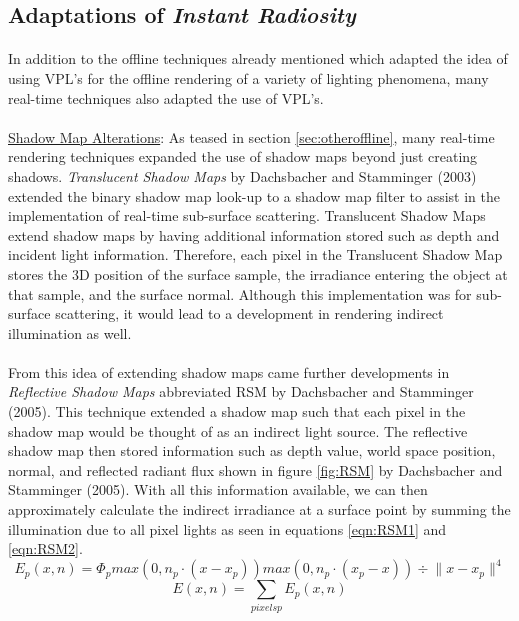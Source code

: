 \subsection{Adaptations of \textit{Instant Radiosity}}
\paragraph{}
In addition to the offline techniques already mentioned which adapted the idea of using VPL's for the offline rendering of a variety of lighting phenomena, many real-time techniques also adapted the use of VPL's.

\paragraph{}
\underline{Shadow Map Alterations}: As teased in section \ref{sec:otheroffline}, many real-time rendering techniques expanded the use of shadow maps beyond just creating shadows.  \textit{Translucent Shadow Maps} by Dachsbacher and Stamminger (2003) extended the binary shadow map look-up to a shadow map filter to assist in the implementation of real-time sub-surface scattering.  Translucent Shadow Maps extend shadow maps by having additional information stored such as depth and incident light information.  Therefore, each pixel in the Translucent Shadow Map stores the 3D position of the surface sample, the irradiance entering the object at that sample, and the surface normal.  Although this implementation was for sub-surface scattering, it would lead to a development in rendering indirect illumination as well.

\paragraph{}
From this idea of extending shadow maps came further developments in \textit{Reflective Shadow Maps} abbreviated RSM by Dachsbacher and Stamminger (2005).  This technique extended a shadow map such that each pixel in the shadow map would be thought of as an indirect light source.  The reflective shadow map then stored information such as depth value, world space position, normal, and reflected radiant flux shown in figure \ref{fig:RSM} by Dachsbacher and Stamminger (2005).  With all this information available, we can then approximately calculate the indirect irradiance at a surface point by summing the illumination due to all pixel lights as seen in equations \ref{eqn:RSM1} and \ref{eqn:RSM2}.
\begin{equation}
E_{p} (x,n) = \Phi_{p} {max(0, n_{p} \cdot (x-x_{p})) max(0, n_{p} \cdot (x_{p} - x))  } \div {\| x-x_{p} \|^{4} } \label{eqn:RSM1}
\end{equation}
\begin{equation}
E(x,n) = \sum_{pixels p} E_{p}(x,n) \label{eqn:RSM2}
\end{equation}

